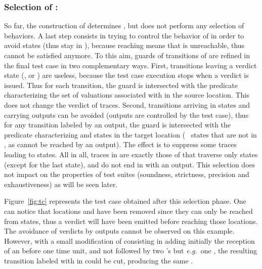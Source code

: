 \documentclass{LMCS}
\theoremstyle{plain}\newtheorem{proposition}[thm]{Proposition}
\def\eg{{\em e.g.}}
\begin{document}
\subsubsection*{Selection of :}
So far, the construction of  determines , but does
not perform any selection of behaviors.  A last step consists in
trying to control the behavior of  in order to avoid 
states (thus stay in ),
because reaching  means that  is unreachable, thus  
cannot be satisfied anymore.  
To this aim, guards of transitions of  are refined in the final
test case  in two complementary ways.  First, transitions leaving
a verdict state (,  or ) are useless, because
the test case execution stops when a verdict is issued.  Thus for each
transition, the guard is intersected with the predicate characterizing
the set of valuations associated with  in the source location.
This does not change the verdict of traces.  
Second, transitions
arriving in  states and carrying outputs can be avoided
(outputs are controlled by the test case), thus for any transition
labeled by an output, the guard is intersected with the predicate
characterizing  and  states in the target location (\ie~
states that are not in , as  cannot be reached by an
output).  The effect is to suppress some traces leading to 
states.  
All in all, traces in  are exactly those of  that
traverse only  states (except for the last state), 
and do not end in  with an output.
This selection does not impact on the properties of test suites
(soundness, strictness, precision and exhaustiveness) as will be seen later.

\begin{exa}
Figure~\ref{fig:tc} represents the test case obtained after this selection phase.
One can notice that locations  and 
have been removed since they can only be reached from  states, 
thus a verdict will have been emitted before reaching those locations.
The avoidance of  verdicts by outputs cannot be observed on this example.
However,  with a small modification of  
consisting in adding initially the reception of an   before one time unit, 
and not followed by two 's but \eg~one , the resulting transition 
labeled with  in  could be cut, producing the same . 
\end{exa}
\end{document}
